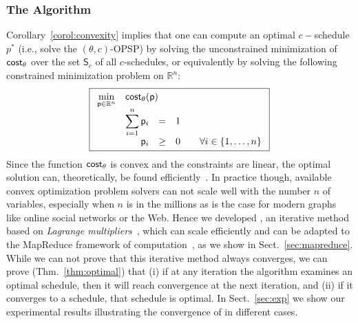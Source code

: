 \subsubsection{The Algorithm}
Corollary~\ref{corol:convexity} implies that one can compute an optimal
$c-$schedule $p^*$ (i.e., solve the $(\theta,c)$-OPSP) by solving the
unconstrained minimization of $\mathsf{cost}_\theta$ over the set $\mathsf{S}_c$ of all
$c$-schedules, or equivalently by solving the following constrained minimization
problem on $\mathbb{R}^n$:
\begin{equation}\label{eq:optimization}
	\boxed{
	\begin{array}{rrclcl}
	\displaystyle \min_{\sched\in\mathbb{R}^n} & \multicolumn{3}{l}{\cost_\theta(\sched)} \\
	&\displaystyle \sum_{i=1}^{n} \sched_i & = & 1 \\
	&\sched_i & \geq & 0 & & \forall i \in \{1,\ldots,n\} \\
	\end{array} }
\end{equation}
Since the function $\mathsf{cost}_\theta$ is convex and the constraints are linear, the
optimal solution can, theoretically, be found efficiently~\citep{BoydV04}. In
practice though, available convex optimization problem solvers can not scale
well with the number $n$ of variables, especially when $n$ is in the millions
as is the case for modern graphs like online social networks or the Web. Hence
we developed \algoname, an iterative method based on \emph{Lagrange
multipliers}~\citep[Sect.~5.1]{BoydV04}, which can scale efficiently and can be
adapted to the MapReduce framework of computation~\citep{dean2008mapreduce}, as
we show in Sect.~\ref{sec:mapreduce}. While we can not prove that this iterative
method always converges, we can prove (Thm.~\ref{thm:optimal}) that (i) if at
any iteration the algorithm examines an optimal schedule, then it will reach
convergence at the next iteration, and (ii) if it converges to a schedule, that
schedule is optimal. In Sect.~\ref{sec:exp} we show our experimental results
illustrating the convergence of \algoname in different cases.

